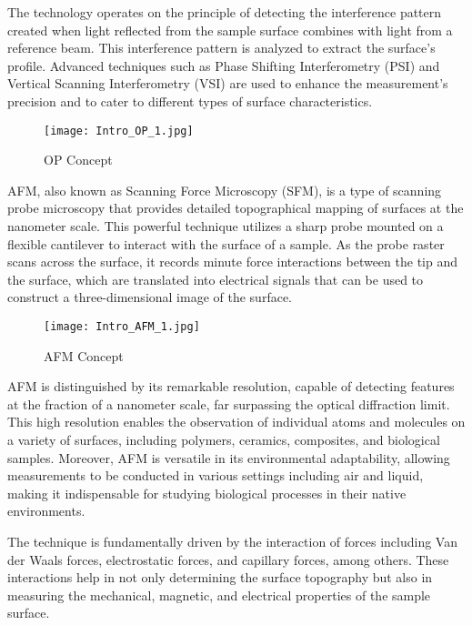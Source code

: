 \documentclass[11pt]{article}
\begin{document}
	The technology operates on the principle of detecting the interference pattern created when light reflected from the sample surface combines with light from a reference beam. This interference pattern is analyzed to extract the surface's profile. Advanced techniques such as Phase Shifting Interferometry (PSI) and Vertical Scanning Interferometry (VSI) are used to enhance the measurement's precision and to cater to different types of surface characteristics.
	
	\begin{figure}[htbp]
		\centering
		\texttt{[image: Intro\_OP\_1.jpg]}
		\caption{OP Concept}
	\end{figure}
	
\clearpage
	
	AFM, also known as Scanning Force Microscopy (SFM), is a type of scanning probe microscopy that provides detailed topographical mapping of surfaces at the nanometer scale. This powerful technique utilizes a sharp probe mounted on a flexible cantilever to interact with the surface of a sample. As the probe raster scans across the surface, it records minute force interactions between the tip and the surface, which are translated into electrical signals that can be used to construct a three-dimensional image of the surface.
	
	\begin{figure}[htbp]
		\centering
		\texttt{[image: Intro\_AFM\_1.jpg]}
		\caption{AFM Concept}
	\end{figure}
	
	AFM is distinguished by its remarkable resolution, capable of detecting features at the fraction of a nanometer scale, far surpassing the optical diffraction limit. This high resolution enables the observation of individual atoms and molecules on a variety of surfaces, including polymers, ceramics, composites, and biological samples. Moreover, AFM is versatile in its environmental adaptability, allowing measurements to be conducted in various settings including air and liquid, making it indispensable for studying biological processes in their native environments.
	
	The technique is fundamentally driven by the interaction of forces including Van der Waals forces, electrostatic forces, and capillary forces, among others. These interactions help in not only determining the surface topography but also in measuring the mechanical, magnetic, and electrical properties of the sample surface.
	
\end{document}
